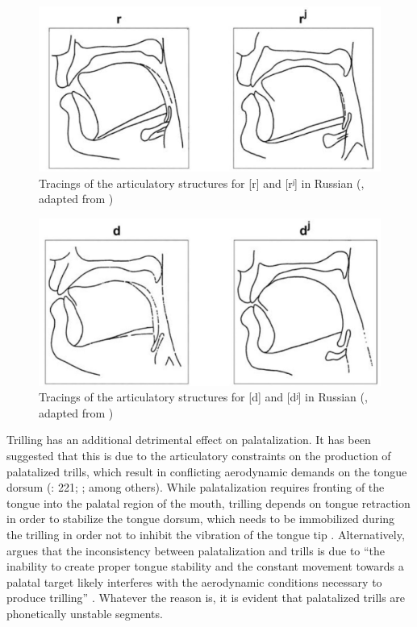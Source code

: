 \documentclass[output=paper]{langscibook}
\begin{document}
\begin{figure}
\includegraphics[width=\textwidth]{figures/a14KavitskayaWandl-img001.jpg}
\caption{\label{fig:kavitskaya:1} Tracings of the articulatory structures for [r] and [rʲ] in Russian (\citealt{IskarousKavitskaya2018}, adapted from \citealt{Bolla1981})}
\end{figure}

\begin{figure}
\includegraphics[width=\textwidth]{figures/a14KavitskayaWandl-img002.jpg}
\caption{\label{fig:kavitskaya:2} Tracings of the articulatory structures for [d] and [dʲ] in Russian (\citealt{IskarousKavitskaya2018}, adapted from \citealt{Bolla1981})}
\end{figure}

Trilling has an additional detrimental effect on palatalization. It has been suggested that this is due to the articulatory constraints on the production of palatalized trills, which result in conflicting aerodynamic demands on the tongue dorsum (\citealt{Kavitskaya1997,LadefogedMaddieson1996}: 221; \citealt{KavitskayaEtAl2009,Proctor2011}; among others). While palatalization requires fronting of the tongue into the palatal region of the mouth, trilling depends on tongue retraction in order to stabilize the tongue dorsum, which needs to be immobilized during the trilling in order not to inhibit the vibration of the tongue tip \citep{McGowan1992}. Alternatively, \citet{Howson2018} argues that the inconsistency between palatalization and trills is due to “the inability to create proper tongue stability and the constant movement towards a palatal target likely interferes with the aerodynamic conditions necessary to produce trilling” \citep[148]{Howson2018}. Whatever the reason is, it is evident that palatalized trills are phonetically unstable segments.
\end{document}
